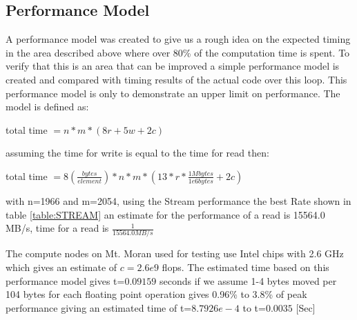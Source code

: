 \documentclass[]{article}%
\begin{document}


%
%
%
%
%
%
%


\subsection{Performance Model}

A performance model was created to give us a rough idea on the expected timing in the area described above where over 80\% of the computation time is spent. To verify that this is an area that can be improved a simple performance model is created and compared with timing results of the actual code over this loop. This performance model is only to demonstrate an upper limit on performance. The model is defined as:

total time $=n*m*(8r+5w+2c)$

assuming the time for write is equal to the time for read then:

total time $=8 (\frac{bytes}{element})*n*m*(13*r*\frac{1Mbytes}{1e6 bytes} + 2c)$

with n=1966 and m=2054, using the Stream performance the best Rate shown in table \ref{table:STREAM} an estimate for the performance of a read is 15564.0 MB/s, time for a read is $\frac{1}{15564.0 MB/s}$


The compute nodes on Mt. Moran used for testing use Intel chips with 2.6 GHz which gives an estimate of $c=2.6e9$ flops. The estimated time based on this performance model gives t=$  0.09159 $ seconds if we assume 1-4 bytes moved per 104 bytes for each floating point operation gives 0.96\% to 3.8\% of peak performance giving an estimated time  of t=$8.7926e-4$ to  t=$0.0035$ [Sec]
\end{document}
